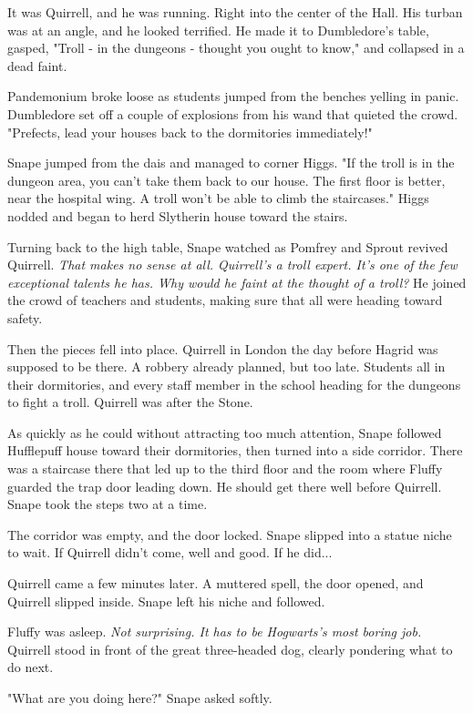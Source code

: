 \documentclass[a4paper,11pt]{article}
\begin{document}
It was Quirrell, and he was running. Right into the center of the Hall. His turban was at an angle, and he looked terrified. He made it to Dumbledore's table, gasped, "Troll - in the dungeons - thought you ought to know," and collapsed in a dead faint.

Pandemonium broke loose as students jumped from the benches yelling in panic. Dumbledore set off a couple of explosions from his wand that quieted the crowd. "Prefects, lead your houses back to the dormitories immediately!"

Snape jumped from the dais and managed to corner Higgs. "If the troll is in the dungeon area, you can't take them back to our house. The first floor is better, near the hospital wing. A troll won't be able to climb the staircases." Higgs nodded and began to herd Slytherin house toward the stairs.

Turning back to the high table, Snape watched as Pomfrey and Sprout revived Quirrell. \emph{That makes no sense at all. Quirrell's a troll expert. It's one of the few exceptional talents he has. Why would he faint at the thought of a troll?} He joined the crowd of teachers and students, making sure that all were heading toward safety.

Then the pieces fell into place. Quirrell in London the day before Hagrid was supposed to be there. A robbery already planned, but too late. Students all in their dormitories, and every staff member in the school heading for the dungeons to fight a troll. Quirrell was after the Stone.

As quickly as he could without attracting too much attention, Snape followed Hufflepuff house toward their dormitories, then turned into a side corridor. There was a staircase there that led up to the third floor and the room where Fluffy guarded the trap door leading down. He should get there well before Quirrell. Snape took the steps two at a time.

The corridor was empty, and the door locked. Snape slipped into a statue niche to wait. If Quirrell didn't come, well and good. If he did...

Quirrell came a few minutes later. A muttered spell, the door opened, and Quirrell slipped inside. Snape left his niche and followed.

Fluffy was asleep. \emph{Not surprising. It has to be Hogwarts's most boring job.} Quirrell stood in front of the great three-headed dog, clearly pondering what to do next.

"What are you doing here?" Snape asked softly.
\end{document}
